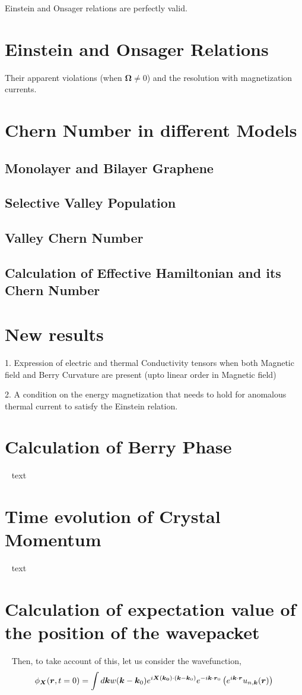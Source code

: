 \documentclass{revtex4-2}
\newcommand{\bvec}[1]{{\mathbf #1}}
\renewcommand\vec[1]{\ensuremath\boldsymbol{#1}} %
\begin{document}
Einstein and Onsager relations are perfectly valid.

\section{Einstein and Onsager Relations}
Their apparent violations (when $\bvec{\Omega} \neq 0$) and the resolution with magnetization currents.

\section{Chern Number in different Models}
\subsection{Monolayer and Bilayer Graphene}
\subsection{Selective Valley Population}
\subsection{Valley Chern Number}
\subsection{Calculation of Effective Hamiltonian and its Chern Number}

\section{New results}
1. Expression of electric and thermal Conductivity tensors when both Magnetic field and Berry Curvature are present (upto linear order in Magnetic field)

2. A condition on the energy magnetization that needs to hold for anomalous thermal current to satisfy the Einstein relation.
\appendix
\section{Calculation of Berry Phase}~\label{app:BerryPhase}
text
\section{Time evolution of Crystal Momentum}~\label{app:crystal-momentum-time-evolution}
text
\section{Calculation of expectation value of the position of the wavepacket}~\label{app:center-at-zero-time}
Then, to take account of this, let us consider the wavefunction, $$\phi_{\vec{X}}(\vec{r}, t=0) = \int d\vec{k} w(\vec{k} - \vec{k}_0) e^{i \vec{X}(\vec{k_0})\cdot (\vec{k} - \vec{k}_0)} e^{-i \vec{k} \cdot \vec{r}_0 } \left(e^{i \vec{k} \cdot\vec{r}} u_{n,\vec{k}}(\vec{r})\right)$$
\end{document}
